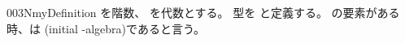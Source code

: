 \documentclass[index]{subfiles}
\begin{document}
\begin{myBlock}{003N}{myDefinition}
  を階数、
  を\myInlineMath{\myCircle}代数とする。
  型を
  と定義する。
  の要素がある時、は
  (initial \myInlineMath{\myCircle}-algebra)であると言う。
\end{myBlock}
\end{document}
